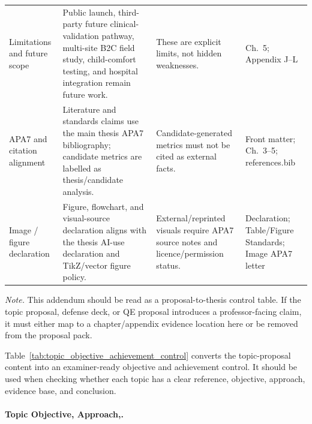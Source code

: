{\begin{xltabular}{\textwidth}{@{} >{\raggedright\arraybackslash}p{2.4cm} p{5.3cm} p{4.0cm} >{\raggedright\arraybackslash}p{2.4cm} @{}}
\addlinespace
Limitations and future scope & Public launch, third-party future clinical-validation pathway, multi-site B2C field study, child-comfort testing, and hospital integration remain future work. & These are explicit limits, not hidden weaknesses. & Ch.~5; Appendix J--L \\
\addlinespace
APA7 and citation alignment & Literature and standards claims use the main thesis APA7 bibliography; candidate metrics are labelled as thesis/candidate analysis. & Candidate-generated metrics must not be cited as external facts. & Front matter; Ch.~3--5; references.bib \\
\addlinespace
Image / figure declaration & Figure, flowchart, and visual-source declaration aligns with the thesis AI-use declaration and TikZ/vector figure policy. & External/reprinted visuals require APA7 source notes and licence/permission status. & Declaration; Table/Figure Standards; Image APA7 letter \\
\end{xltabular}}
\vspace{0.5em}
\noindent\textit{Note.} This addendum should be read as a proposal-to-thesis control table. If the topic proposal, defense deck, or QE proposal introduces a professor-facing claim, it must either map to a chapter/appendix evidence location here or be removed from the proposal pack.

\noindent Table~\ref{tab:topic_objective_achievement_control} converts the topic-proposal content into an examiner-ready objective and achievement control. It should be used when checking whether each topic has a clear reference, objective, approach, evidence base, and conclusion.

\paragraph{Topic Objective, Approach,.}





